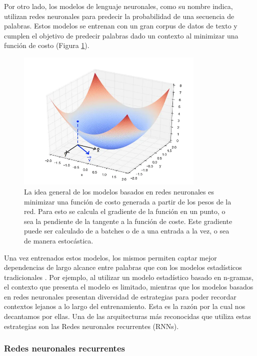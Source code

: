 Por otro lado, los modelos de lenguaje neuronales, como su nombre indica, utilizan redes neuronales para predecir la probabilidad de una secuencia de palabras. Estos modelos se entrenan con un gran corpus de datos de texto y cumplen el objetivo de predecir palabras dado un contexto al minimizar una función de costo (Figura \ref{fig:gradiente}).

\begin{figure}[H]
    \centering
    \includegraphics[width=0.8\textwidth]{imagenes/function.jpg}
    \caption{La idea general de los modelos basados en redes neuronales es minimizar una función de costo generada a partir de los pesos de la red. Para esto se calcula el gradiente de la función en un punto, o sea la pendiente de la tangente a la función de coste. Este gradiente puede ser calculado de a batches o de a una entrada a la vez, o sea de manera estocástica.}
    \label{fig:gradiente}
\end{figure}

Una vez entrenados estos modelos, los mismos permiten captar mejor dependencias de largo alcance entre palabras que con los modelos estadísticos tradicionales \parencite{Wang2017ngram}. Por ejemplo, al utilizar un modelo estadístico basado en n-gramas, el contexto que presenta el modelo es limitado, mientras que los modelos basados en redes neuronales presentan diversidad de estrategias para poder recordar contextos lejanos a lo largo del entrenamiento. Esta es la razón por la cual nos decantamos por ellas. Una de las arquitecturas más reconocidas que utiliza estas estrategias son las Redes neuronales recurrentes (RNNs).

\subsubsection{Redes neuronales recurrentes}

